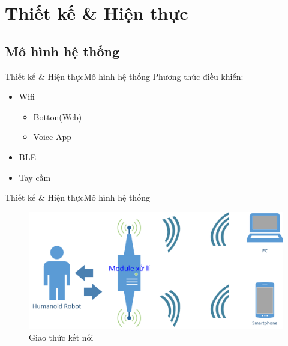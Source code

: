 \documentclass[compress, blue, 13pt,hyperref={pdfpagemode=FullScreen}]{beamer}
\begin{document}
\section{Thiết kế \& Hiện thực}
\subsection{Mô hình hệ thống}
\begin{frame}{Thiết kế \& Hiện thực}{Mô hình hệ thống}
Phương thức điều khiển:
\begin{itemize}
\item Wifi
\begin{itemize}
\item Botton(Web)
\item Voice App
\end{itemize}
\item BLE
\item Tay cầm
\end{itemize}
\end{frame}
\begin{frame}{Thiết kế \& Hiện thực}{Mô hình hệ thống}
\begin{figure}[hbtp]
\centering
\includegraphics[scale=0.5]{images/protocol.png}
\caption{Giao thức kết nối}
\end{figure}
\end{frame}
\end{document}
